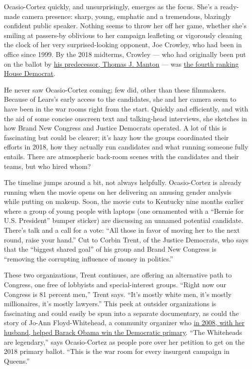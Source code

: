 Ocasio-Cortez quickly, and unsurprisingly, emerges as the focus. She's a
ready-made camera presence: sharp, young, emphatic and a tremendous,
blazingly confident public speaker. Nothing seems to throw her off her
game, whether she's smiling at passers-by oblivious to her campaign
leafleting or vigorously cleaning the clock of her very
surprised-looking opponent, Joe Crowley, who had been in office since
1999. By the 2018 midterms, Crowley --- who had originally been put on
the ballot by
\href{https://www.nytimes3xbfgragh.onion/1998/07/22/nyregion/manton-plans-to-retire-from-congress-at-end-of-year.html}{his
predecessor, Thomas J. Manton} --- was
\href{Democratic\%20Caucus\%20Chairman\%20of\%20the\%20United\%20States\%20House\%20of\%20Representatives,}{the
fourth ranking House Democrat}.

He never saw Ocasio-Cortez coming; few did, other than these filmmakers.
Because of Lears's early access to the candidates, she and her camera
seem to have been in the war rooms right from the start. Quickly and
efficiently, and with the aid of some concise onscreen text and
talking-head interviews, she sketches in how Brand New Congress and
Justice Democrats operated. A lot of this is fascinating but could be
clearer; it's hazy how the groups coordinated their efforts in 2018, how
they actually run candidates and what running someone fully entails.
There are atmospheric back-room scenes with the candidates and their
teams, but who hired whom?

The timeline jumps around a bit, not always helpfully. Ocasio-Cortez is
already running when the movie opens on her delivering an amusing gender
analysis while putting on makeup. Soon, the movie cuts to Kentucky nine
months earlier where a group of young people with laptops (one
ornamented with a ``Bernie for U.S. President'' bumper sticker) are
discussing an unnamed potential candidate. There's talk and a call for a
vote: ``All those in favor of moving her to the next round, raise your
hand.'' Cut to Corbin Trent, of the Justice Democrats, who says that the
``biggest shared goal'' of his group and Brand New Congress is
``removing the corrupting influence of money in politics.''

These two organizations, Trent continues, are offering an alternative
path to Congress, one free of lobbyists and special-interest groups.
``Right now our Congress is 81 percent men,'' Trent says. ``It's mostly
white men, it's mostly millionaires, it's mostly lawyers.'' This peek at
outsider organizations is fascinating and could easily be spun into a
separate documentary, as could the story of Jo-Ann Floyd-Whitehead, a
community organizer who
\href{https://www.nytimes3xbfgragh.onion/2009/09/04/nyregion/04race.html}{in
2008, with her husband, helped Barack Obama win the Democratic primary}.
``The Whiteheads are legendary,'' says Ocasio-Cortez as people pore over
her petition to get on the 2018 primary ballot. ``This is the war room
for every insurgent campaign in Queens.''

